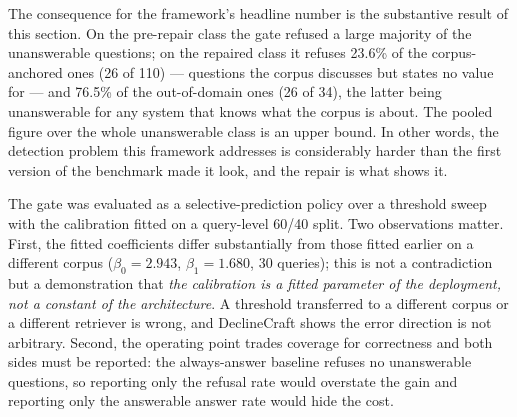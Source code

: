 \documentclass[preprint,3p,times]{elsarticle}
\begin{document}
The consequence for the framework's headline number is the substantive result
of this section. On the pre-repair class the gate refused a large majority of
the unanswerable questions; on the repaired class it refuses
23.6\% of the corpus-anchored ones
(26 of 110) --- questions the corpus discusses but states no
value for --- and 76.5\% of the out-of-domain ones
(26 of 34), the latter being unanswerable for any system that
knows what the corpus is about. The pooled figure over the whole unanswerable
class is an upper bound. In other words, the detection problem this framework
addresses is considerably harder than the first version of the benchmark made
it look, and the repair is what shows it.


The gate was evaluated as a selective-prediction policy over a threshold sweep
with the calibration fitted on a query-level 60/40 split. Two observations
matter. First, the fitted coefficients differ substantially from those fitted
earlier on a different corpus ($\beta_0=2.943$, $\beta_1=1.680$, 30 queries);
this is not a contradiction but a demonstration that \emph{the calibration is a
fitted parameter of the deployment, not a constant of the architecture}. A
threshold transferred to a different corpus or a different retriever is wrong,
and DeclineCraft shows the error direction is not arbitrary. Second, the
operating point trades coverage for correctness and both sides must be reported:
the always-answer baseline refuses no unanswerable questions, so reporting only
the refusal rate would overstate the gain and reporting only the answerable
answer rate would hide the cost.
\end{document}
